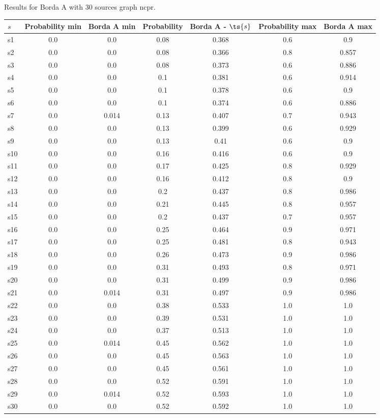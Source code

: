 \documentclass{article}
\begin{document}
\noindent Results for Borda A with 30 sources graph ncpr.

\noindent\begin{tabular}{|l|c|c|c|c|c|c|}
\hline
$s$& Probability min & Borda A min & Probability & Borda A - $\ts{s}$ & Probability max & Borda A max\\
\hline
s1 &0.0 & 0.0 & 0.08 & 0.368 & 0.6 & 0.9\\
\hline
s2 &0.0 & 0.0 & 0.08 & 0.366 & 0.8 & 0.857\\
\hline
s3 &0.0 & 0.0 & 0.08 & 0.373 & 0.6 & 0.886\\
\hline
s4 &0.0 & 0.0 & 0.1 & 0.381 & 0.6 & 0.914\\
\hline
s5 &0.0 & 0.0 & 0.1 & 0.378 & 0.6 & 0.9\\
\hline
s6 &0.0 & 0.0 & 0.1 & 0.374 & 0.6 & 0.886\\
\hline
s7 &0.0 & 0.014 & 0.13 & 0.407 & 0.7 & 0.943\\
\hline
s8 &0.0 & 0.0 & 0.13 & 0.399 & 0.6 & 0.929\\
\hline
s9 &0.0 & 0.0 & 0.13 & 0.41 & 0.6 & 0.9\\
\hline
s10 &0.0 & 0.0 & 0.16 & 0.416 & 0.6 & 0.9\\
\hline
s11 &0.0 & 0.0 & 0.17 & 0.425 & 0.8 & 0.929\\
\hline
s12 &0.0 & 0.0 & 0.16 & 0.412 & 0.8 & 0.9\\
\hline
s13 &0.0 & 0.0 & 0.2 & 0.437 & 0.8 & 0.986\\
\hline
s14 &0.0 & 0.0 & 0.21 & 0.445 & 0.8 & 0.957\\
\hline
s15 &0.0 & 0.0 & 0.2 & 0.437 & 0.7 & 0.957\\
\hline
s16 &0.0 & 0.0 & 0.25 & 0.464 & 0.9 & 0.971\\
\hline
s17 &0.0 & 0.0 & 0.25 & 0.481 & 0.8 & 0.943\\
\hline
s18 &0.0 & 0.0 & 0.26 & 0.473 & 0.9 & 0.986\\
\hline
s19 &0.0 & 0.0 & 0.31 & 0.493 & 0.8 & 0.971\\
\hline
s20 &0.0 & 0.0 & 0.31 & 0.499 & 0.9 & 0.986\\
\hline
s21 &0.0 & 0.014 & 0.31 & 0.497 & 0.9 & 0.986\\
\hline
s22 &0.0 & 0.0 & 0.38 & 0.533 & 1.0 & 1.0\\
\hline
s23 &0.0 & 0.0 & 0.39 & 0.531 & 1.0 & 1.0\\
\hline
s24 &0.0 & 0.0 & 0.37 & 0.513 & 1.0 & 1.0\\
\hline
s25 &0.0 & 0.014 & 0.45 & 0.562 & 1.0 & 1.0\\
\hline
s26 &0.0 & 0.0 & 0.45 & 0.563 & 1.0 & 1.0\\
\hline
s27 &0.0 & 0.0 & 0.45 & 0.561 & 1.0 & 1.0\\
\hline
s28 &0.0 & 0.0 & 0.52 & 0.591 & 1.0 & 1.0\\
\hline
s29 &0.0 & 0.014 & 0.52 & 0.593 & 1.0 & 1.0\\
\hline
s30 &0.0 & 0.0 & 0.52 & 0.592 & 1.0 & 1.0\\
\hline
\end{tabular}\\
\end{document}
